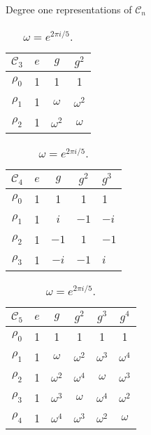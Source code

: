 \documentclass[handout,  12pt]{beamer}
\newcommand{\1}{\mathbf{1}}
\newcommand{\0}{\mathbf{0}}
\newcommand{\Cyc}{\mathcal{C}}%
\begin{document}
	\begin{frame}{Degree one representations of $\Cyc_n$}
		\begin{table}
			\parbox[s]{.45\linewidth}{
			\begin{table}
				\centering
				\begin{tabular}{c | c c c}
					$\Cyc_3$ & $e$ & $g$        & $g^2$      \\ \hline
					$\rho_0$          & 1   & 1          & 1          \\
					$\rho_1$          & 1   & $\omega$   & $\omega^2$ \\
					$\rho_2$          & 1   & $\omega^2$ & $\omega$
				\end{tabular} 
				\caption{$\omega = e^{2 \pi i/3}$.}
				\label{table:Cyc3}
				\begin{tabular}{c | c c cl}
					$\Cyc_4$ & $e$ & $g$  & $g^2$ & $g^3$ \\ \hline
					$\rho_0$           & 1   & 1    & 1     & 1     \\
					$\rho_1$           & 1   & $i$  & $-1$  & $-i$  \\
					$\rho_2$           & 1   & $-1$ & $1$  & $-1$   \\
					$\rho_3$           & 1   & $-i$ & $-1$   & $i$
				\end{tabular}
				\caption{$\omega = e^{\pi i/2}$.}
				\label{tbl:cyc4}
			\end{table}
			}
			\hfill
			\parbox[s]{.45\linewidth}{
				\begin{table}
					\centering
					\begin{tabular}{c | c c c c c}
						$\Cyc_5$ & $e$ & $g$        & $g^2$      & $g^3$      & $g^4$      \\ \hline
						$\rho_0$            & 1   & 1          & 1          & 1          & 1          \\
						$\rho_1$            & 1   & $\omega$ & $\omega^2$ & $\omega^3$ & $\omega^4$ \\
						$\rho_2$            & 1   & $\omega^2$ & $\omega^4$ & $\omega$ & $\omega^3$ \\
						$\rho_3$            & 1   & $\omega^3$ & $\omega$ & $\omega^4$ & $\omega^2$ \\
						$\rho_4$            & 1   & $\omega^4$ & $\omega^3$ & $\omega^2$ & $\omega$
					\end{tabular}
					\caption{$\omega = e^{2 \pi i/5}$.}
					\label{table:Cyc5}
				\end{table}
			}
		\end{table}
	\end{frame}
	
\end{document}
